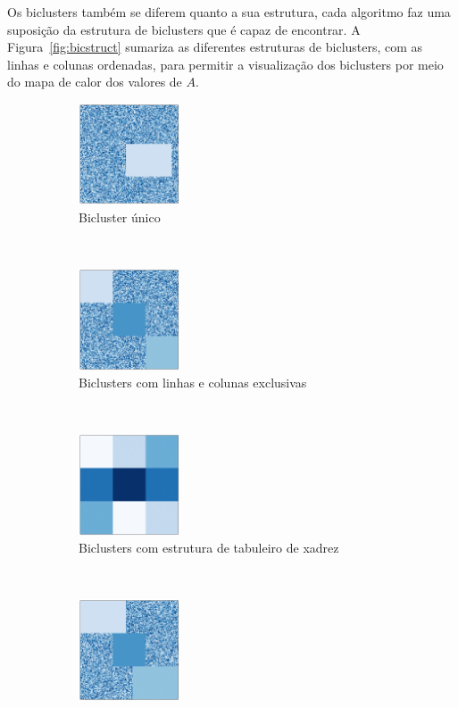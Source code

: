 \documentclass[normaltoc, espacoumemeio, pnumromarab,ruledheader]{abnt}
\begin{document}
Os biclusters também se diferem quanto a sua estrutura, cada algoritmo faz uma suposição da estrutura de biclusters que é capaz de encontrar. A Figura~\ref{fig:bicstruct} sumariza as diferentes estruturas de biclusters, com as linhas e colunas ordenadas, para permitir a visualização dos biclusters por meio do mapa de calor dos valores de $A$.

\begin{figure}[h]
    \centering
    \begin{subfigure}[b]{0.3\textwidth}
            \includegraphics[width=30mm]{img/a-bic-struct.png}
            \caption{Bicluster único}
            \label{fig:bicstruct-a}
    \end{subfigure}
    ~
    \centering
    \begin{subfigure}[b]{0.3\textwidth}
            \includegraphics[width=30mm]{img/b-bic-struct.png}
            \caption{Biclusters com linhas e colunas exclusivas}
            \label{fig:bicstruct-b}
    \end{subfigure}
    ~
    \centering
    \begin{subfigure}[b]{0.3\textwidth}
            \includegraphics[width=30mm]{img/c-bic-struct.png}
            \caption{Biclusters com estrutura de tabuleiro de xadrez}
            \label{fig:bicstruct-c}
    \end{subfigure}
    ~
    \centering
    \begin{subfigure}[b]{0.3\textwidth}
            \includegraphics[width=30mm]{img/d-bic-struct.png}

\end{subfigure}
\end{figure}
\end{document}
